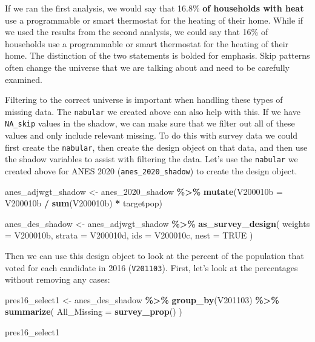 \documentclass[
]{krantz}
\makeatletter
\newenvironment{Shaded}{\begin{snugshade}}{\end{snugshade}}
\newcommand{\AttributeTok}[1]{\textcolor[rgb]{0.27,0.27,0.27}{#1}}
\newcommand{\ConstantTok}[1]{\textcolor[rgb]{0.37,0.37,0.37}{#1}}
\newcommand{\FunctionTok}[1]{\textcolor[rgb]{0.27,0.27,0.27}{\textbf{#1}}}
\newcommand{\NormalTok}[1]{#1}
\newcommand{\OtherTok}[1]{\textcolor[rgb]{0.37,0.37,0.37}{#1}}
\newcommand{\SpecialCharTok}[1]{\textcolor[rgb]{0.43,0.43,0.43}{\textbf{#1}}}
\newenvironment{kframe}{%
\medskip{}
\setlength{\fboxsep}{.8em}
 \def\at@end@of@kframe{}%
 \ifinner\ifhmode%
  \def\at@end@of@kframe{\end{minipage}}%
  \begin{minipage}{\columnwidth}%
 \fi\fi%
 \def\FrameCommand##1{\hskip\@totalleftmargin \hskip-\fboxsep
 \colorbox{shadecolor}{##1}\hskip-\fboxsep
     \hskip-\linewidth \hskip-\@totalleftmargin \hskip\columnwidth}%
 \MakeFramed {\advance\hsize-\width
   \@totalleftmargin\z@ \linewidth\hsize
   \@setminipage}}%
 {\par\unskip\endMakeFramed%
 \at@end@of@kframe}
\renewenvironment{Shaded}{\begin{kframe}}{\end{kframe}}
\makeatother
\begin{document}
If we ran the first analysis, we would say that 16.8\% \textbf{of households with heat} use a programmable or smart thermostat for the heating of their home. While if we used the results from the second analysis, we could say that 16\% of households use a programmable or smart thermostat for the heating of their home. The distinction of the two statements is bolded for emphasis. Skip patterns often change the universe that we are talking about and need to be carefully examined.

Filtering to the correct universe is important when handling these types of missing data. The \texttt{nabular} we created above can also help with this. If we have \texttt{NA\_skip} values in the shadow, we can make sure that we filter out all of these values and only include relevant missing. To do this with survey data we could first create the \texttt{nabular}, then create the design object on that data, and then use the shadow variables to assist with filtering the data. Let's use the \texttt{nabular} we created above for ANES 2020 (\texttt{anes\_2020\_shadow}) to create the design object.

\begin{Shaded}
\begin{Highlighting}[]
\NormalTok{anes\_adjwgt\_shadow }\OtherTok{\textless{}{-}}\NormalTok{ anes\_2020\_shadow }\SpecialCharTok{\%\textgreater{}\%}
  \FunctionTok{mutate}\NormalTok{(}\AttributeTok{V200010b =}\NormalTok{ V200010b }\SpecialCharTok{/} \FunctionTok{sum}\NormalTok{(V200010b) }\SpecialCharTok{*}\NormalTok{ targetpop)}

\NormalTok{anes\_des\_shadow }\OtherTok{\textless{}{-}}\NormalTok{ anes\_adjwgt\_shadow }\SpecialCharTok{\%\textgreater{}\%}
  \FunctionTok{as\_survey\_design}\NormalTok{(}
    \AttributeTok{weights =}\NormalTok{ V200010b,}
    \AttributeTok{strata =}\NormalTok{ V200010d,}
    \AttributeTok{ids =}\NormalTok{ V200010c,}
    \AttributeTok{nest =} \ConstantTok{TRUE}
\NormalTok{  )}
\end{Highlighting}
\end{Shaded}

Then we can use this design object to look at the percent of the population that voted for each candidate in 2016 (\texttt{V201103}). First, let's look at the percentages without removing any cases:

\begin{Shaded}
\begin{Highlighting}[]
\NormalTok{pres16\_select1 }\OtherTok{\textless{}{-}}\NormalTok{ anes\_des\_shadow }\SpecialCharTok{\%\textgreater{}\%}
  \FunctionTok{group\_by}\NormalTok{(V201103) }\SpecialCharTok{\%\textgreater{}\%}
  \FunctionTok{summarize}\NormalTok{(}
    \AttributeTok{All\_Missing =} \FunctionTok{survey\_prop}\NormalTok{()}
\NormalTok{  )}

\NormalTok{pres16\_select1}
\end{Highlighting}
\end{Shaded}
\end{document}
